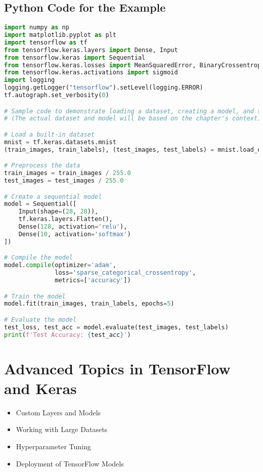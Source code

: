 \documentclass[a4paper,12pt]{book}
\begin{document}
\section{Python Code for the Example}
\begin{lstlisting}[language=Python]
import numpy as np
import matplotlib.pyplot as plt
import tensorflow as tf
from tensorflow.keras.layers import Dense, Input
from tensorflow.keras import Sequential
from tensorflow.keras.losses import MeanSquaredError, BinaryCrossentropy
from tensorflow.keras.activations import sigmoid
import logging
logging.getLogger("tensorflow").setLevel(logging.ERROR)
tf.autograph.set_verbosity(0)

# Sample code to demonstrate loading a dataset, creating a model, and training
# (The actual dataset and model will be based on the chapter's context)

# Load a built-in dataset
mnist = tf.keras.datasets.mnist
(train_images, train_labels), (test_images, test_labels) = mnist.load_data()

# Preprocess the data
train_images = train_images / 255.0
test_images = test_images / 255.0

# Create a sequential model
model = Sequential([
    Input(shape=(28, 28)),
    tf.keras.layers.Flatten(),
    Dense(128, activation='relu'),
    Dense(10, activation='softmax')
])

# Compile the model
model.compile(optimizer='adam',
              loss='sparse_categorical_crossentropy',
              metrics=['accuracy'])

# Train the model
model.fit(train_images, train_labels, epochs=5)

# Evaluate the model
test_loss, test_acc = model.evaluate(test_images, test_labels)
print(f'Test Accuracy: {test_acc}')
\end{lstlisting}

\chapter{Advanced Topics in TensorFlow and Keras}
\begin{itemize}
    \item Custom Layers and Models
    \item Working with Large Datasets
    \item Hyperparameter Tuning
    \item Deployment of TensorFlow Models
\end{itemize}
\end{document}
